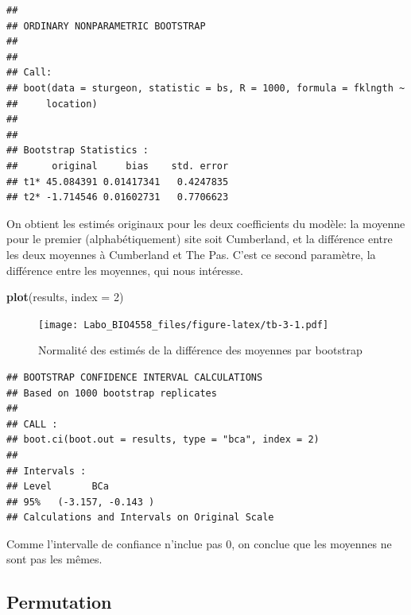 \documentclass[12pt,]{book}
\newenvironment{Shaded}{\begin{snugshade}}{\end{snugshade}}
\newcommand{\CommentTok}[1]{\textcolor[rgb]{0.37,0.37,0.37}{\textit{#1}}}
\newcommand{\DataTypeTok}[1]{\textcolor[rgb]{0.27,0.27,0.27}{#1}}
\newcommand{\DecValTok}[1]{\textcolor[rgb]{0.06,0.06,0.06}{#1}}
\newcommand{\KeywordTok}[1]{\textcolor[rgb]{0.27,0.27,0.27}{\textbf{#1}}}
\newcommand{\NormalTok}[1]{#1}
\newcommand{\StringTok}[1]{\textcolor[rgb]{0.5,0.5,0.5}{#1}}
\begin{document}
\begin{verbatim}
## 
## ORDINARY NONPARAMETRIC BOOTSTRAP
## 
## 
## Call:
## boot(data = sturgeon, statistic = bs, R = 1000, formula = fklngth ~ 
##     location)
## 
## 
## Bootstrap Statistics :
##      original     bias    std. error
## t1* 45.084391 0.01417341   0.4247835
## t2* -1.714546 0.01602731   0.7706623
\end{verbatim}

On obtient les estimés originaux pour les deux coefficients du modèle: la moyenne pour le premier (alphabétiquement) site soit Cumberland, et la différence entre les deux moyennes à Cumberland et The Pas. C'est ce second paramètre, la différence entre les moyennes, qui nous intéresse.

\begin{Shaded}
\begin{Highlighting}[]
\KeywordTok{plot}\NormalTok{(results, }\DataTypeTok{index =} \DecValTok{2}\NormalTok{)}
\end{Highlighting}
\end{Shaded}

\begin{figure}
\centering
\texttt{[image: Labo\_BIO4558\_files/figure-latex/tb-3-1.pdf]}
\caption{\label{fig:tb-3}Normalité des estimés de la différence des moyennes par bootstrap}
\end{figure}

\begin{Shaded}
\end{Shaded}

\begin{verbatim}
## BOOTSTRAP CONFIDENCE INTERVAL CALCULATIONS
## Based on 1000 bootstrap replicates
## 
## CALL : 
## boot.ci(boot.out = results, type = "bca", index = 2)
## 
## Intervals : 
## Level       BCa          
## 95%   (-3.157, -0.143 )  
## Calculations and Intervals on Original Scale
\end{verbatim}

Comme l'intervalle de confiance n'inclue pas 0, on conclue que les moyennes ne sont pas les mêmes.

\hypertarget{permutation}{%
\subsection{Permutation}\label{permutation}}
\end{document}
